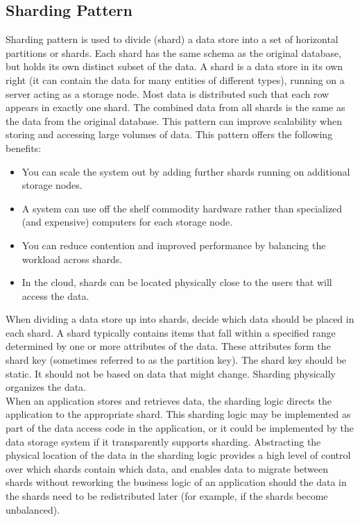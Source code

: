 \documentclass[10pt, conference]{IEEEtran}
\begin{document}
\subsection{Sharding Pattern}
\indent Sharding pattern is used to divide (shard) a data store into a set of horizontal partitions or shards. Each shard has the same schema as the original database, but holds its own distinct subset of the data. A shard is a data store in its own right (it can contain the data for many entities of different types), running on a server acting as a storage node. Most data is distributed such that each row appears in exactly one shard. The combined data from all shards is the same as the data from the original database. This pattern can improve scalability when storing and accessing large volumes of data. This pattern offers the following benefits:
\begin{itemize}
\item You can scale the system out by adding further shards running on additional storage nodes.
\item A system can use off the shelf commodity hardware rather than specialized (and expensive) computers for each storage node.
\item You can reduce contention and improved performance by balancing the workload across shards.
\item In the cloud, shards can be located physically close to the users that will access the data.
\end{itemize}
\indent When dividing a data store up into shards, decide which data should be placed in each shard. A shard typically contains items that fall within a specified range determined by one or more attributes of the data. These attributes form the shard key (sometimes referred to as the partition key). The shard key should be static. It should not be based on data that might change. Sharding physically organizes the data.\\
\indent  When an application stores and retrieves data, the sharding logic directs the application to the appropriate shard. This sharding logic may be implemented as part of the data access code in the application, or it could be implemented by the data storage system if it transparently supports sharding. Abstracting the physical location of the data in the sharding logic provides a high level of control over which shards contain which data, and enables data to migrate between shards without reworking the business logic of an application should the data in the shards need to be redistributed later (for example, if the shards become unbalanced).\\
\end{document}
